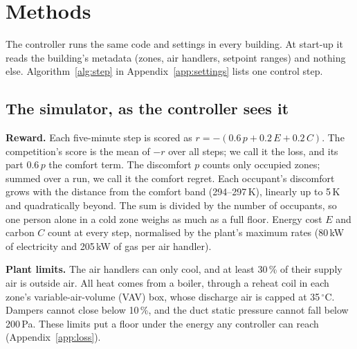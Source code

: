 \documentclass{article}
\begin{document}
\section{Methods}\label{sec:method}
The controller runs the same code and settings in every building. At start-up it reads the building's metadata
(zones, air handlers, setpoint ranges) and nothing else. Algorithm~\ref{alg:step} in
Appendix~\ref{app:settings} lists one control step.

\subsection{The simulator, as the controller sees it}\label{sec:sim}
\textbf{Reward.} Each five-minute step is scored as $r=-(0.6\,p+0.2\,E+0.2\,C)$. The competition's score is the
mean of $-r$ over all steps; we call it the loss, and its part $0.6\,p$ the comfort term. The discomfort $p$ counts
only occupied zones; summed over a run, we call it the comfort regret. Each occupant's
discomfort grows with the distance from the comfort band (294--297\,K), linearly up to 5\,K and quadratically beyond.
The sum is divided by the number of occupants, so one person alone in a cold zone weighs as much as a full floor.
Energy cost $E$ and carbon $C$ count at every step, normalised by the plant's maximum
rates (80\,kW of electricity and 205\,kW of gas per air handler).

\textbf{Plant limits.} The air handlers can only cool, and at least 30\,\% of their supply air is outside air. All
heat comes from a boiler, through a reheat coil in each zone's variable-air-volume (VAV) box, whose discharge air is
capped at 35\,$^\circ$C.
Dampers cannot close below 10\,\%, and the duct static pressure cannot fall below 200\,Pa. These limits put a floor
under the energy any controller can reach (Appendix~\ref{app:loss}).
\end{document}
